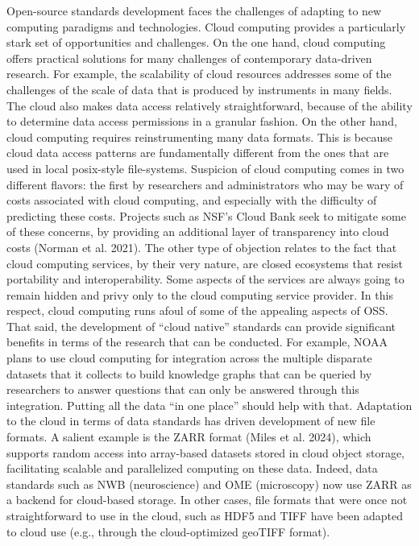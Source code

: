 \documentclass[
  letterpaper,
  DIV=11,
  numbers=noendperiod]{scrartcl}
\begin{document}
Open-source standards development faces the challenges of adapting to
new computing paradigms and technologies. Cloud computing provides a
particularly stark set of opportunities and challenges. On the one hand,
cloud computing offers practical solutions for many challenges of
contemporary data-driven research. For example, the scalability of cloud
resources addresses some of the challenges of the scale of data that is
produced by instruments in many fields. The cloud also makes data access
relatively straightforward, because of the ability to determine data
access permissions in a granular fashion. On the other hand, cloud
computing requires reinstrumenting many data formats. This is because
cloud data access patterns are fundamentally different from the ones
that are used in local posix-style file-systems. Suspicion of cloud
computing comes in two different flavors: the first by researchers and
administrators who may be wary of costs associated with cloud computing,
and especially with the difficulty of predicting these costs. Projects
such as NSF's Cloud Bank seek to mitigate some of these concerns, by
providing an additional layer of transparency into cloud costs (Norman
et al. 2021). The other type of objection relates to the fact that cloud
computing services, by their very nature, are closed ecosystems that
resist portability and interoperability. Some aspects of the services
are always going to remain hidden and privy only to the cloud computing
service provider. In this respect, cloud computing runs afoul of some of
the appealing aspects of OSS. That said, the development of ``cloud
native'' standards can provide significant benefits in terms of the
research that can be conducted. For example, NOAA plans to use cloud
computing for integration across the multiple disparate datasets that it
collects to build knowledge graphs that can be queried by researchers to
answer questions that can only be answered through this integration.
Putting all the data ``in one place'' should help with that. Adaptation
to the cloud in terms of data standards has driven development of new
file formats. A salient example is the ZARR format (Miles et al. 2024),
which supports random access into array-based datasets stored in cloud
object storage, facilitating scalable and parallelized computing on
these data. Indeed, data standards such as NWB (neuroscience) and OME
(microscopy) now use ZARR as a backend for cloud-based storage. In other
cases, file formats that were once not straightforward to use in the
cloud, such as HDF5 and TIFF have been adapted to cloud use (e.g.,
through the cloud-optimized geoTIFF format).
\end{document}
